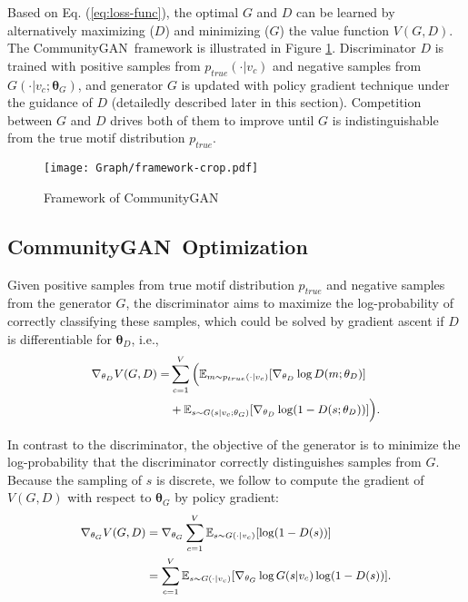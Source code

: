 \documentclass[sigconf]{acmart}
\newcommand{\ComGAN}{CommunityGAN}
\begin{document}
Based on Eq. (\ref{eq:loss-func}), the optimal $G$ and $D$ can be learned by alternatively maximizing ($D$) and minimizing ($G$) the value function $V(G, D)$.
The \ComGAN~framework is illustrated in Figure \ref{fig:framework}.
Discriminator $D$ is trained with positive samples from $p_{true}(\cdot|v_c)$ and negative samples from $G(\cdot|v_c;\mathbf{\theta}_G)$, and generator $G$ is updated with policy gradient technique \cite{sutton2000policy} under the guidance of $D$ (detailedly described later in this section).
Competition between $G$ and $D$ drives both of them to improve until $G$ is indistinguishable from the true motif distribution $p_{true}$.



\begin{figure}[tbp]
\texttt{[image: Graph/framework-crop.pdf]}
\caption{Framework of \ComGAN}
\label{fig:framework}
\end{figure}


\subsection{\ComGAN~Optimization}
Given positive samples from true motif distribution $p_{true}$ and negative samples from the generator $G$, the discriminator aims to maximize the log-probability of correctly classifying these samples, which could be solved by gradient ascent if $D$ is differentiable for $\mathbf{\theta}_D$, i.e.,
\begin{equation}
  \small
  \label{eq:p-V-p-D}
  \begin{aligned}
    \nabla_{\mathbf{\theta}_D}V(G,D) = & \sum_{c=1}^V \Big(\mathbb{E}_{m \sim p_{true}(\cdot|v_c)}[\nabla_{\mathbf{\theta}_D} \log D(m;\mathbf{\theta}_D)] \\
    &+\mathbb{E}_{s \sim G(s|v_c;\mathbf{\theta}_G)}[\nabla_{\mathbf{\theta}_D} \log (1 - D(s;\mathbf{\theta}_D))] \Big).
  \end{aligned}
\end{equation}




In contrast to the discriminator, the objective of the generator is to minimize the log-probability that the discriminator correctly distinguishes samples from $G$.
Because the sampling of $s$ is discrete, we follow \cite{schulman2015gradient,yu2017seqgan,GraphGAN} to compute the gradient of $V(G,D)$ with respect to $\mathbf{\theta}_G$ by policy gradient:
\begin{equation}
  \small
  \label{eq:p-V-p-G}
  \begin{aligned}
     \nabla_{\mathbf{\theta}_G} V(G,D) &=\nabla_{\mathbf{\theta}_G} \sum_{c=1}^V{\mathbb{E}_{s \sim G(\cdot|v_c)}[\log(1 - D(s))]} \\
    &=\sum_{c=1}^V{\mathbb{E}_{s \sim G(\cdot|v_c)}[\nabla_{\mathbf{\theta}_G} \log G(s|v_c)\log(1 - D(s))]}.
  \end{aligned}
\end{equation}
\end{document}
